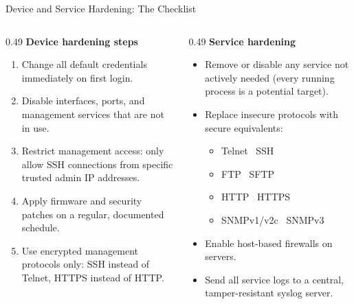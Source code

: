 \documentclass[aspectratio=169]{beamer}  %
\begin{document}
\begin{frame}{Device and Service Hardening: The Checklist}
    \begin{columns}[T]
        \begin{column}{0.49\textwidth}
            \footnotesize
            \textbf{Device hardening steps}
            \begin{enumerate}
                \item Change all default credentials immediately on first login.
                \item Disable interfaces, ports, and management services that are not in use.
                \item Restrict management access: only allow SSH connections from specific trusted admin IP addresses.
                \item Apply firmware and security patches on a regular, documented schedule.
                \item Use encrypted management protocols only:
                    SSH instead of Telnet, HTTPS instead of HTTP.
            \end{enumerate}
        \end{column}
        \begin{column}{0.49\textwidth}
            \footnotesize
            \textbf{Service hardening}
            \begin{itemize}
                \item Remove or disable any service not actively needed (every running process is a potential target).
                \item Replace insecure protocols with secure equivalents:
                    \begin{itemize}\footnotesize
                        \item Telnet \textrightarrow\ SSH
                        \item FTP \textrightarrow\ SFTP
                        \item HTTP \textrightarrow\ HTTPS
                        \item SNMPv1/v2c \textrightarrow\ SNMPv3
                    \end{itemize}
                \item Enable host-based firewalls on servers.
                \item Send all service logs to a central, tamper-resistant syslog server.
            \end{itemize}
        \end{column}
    \end{columns}
\end{frame}
\end{document}
